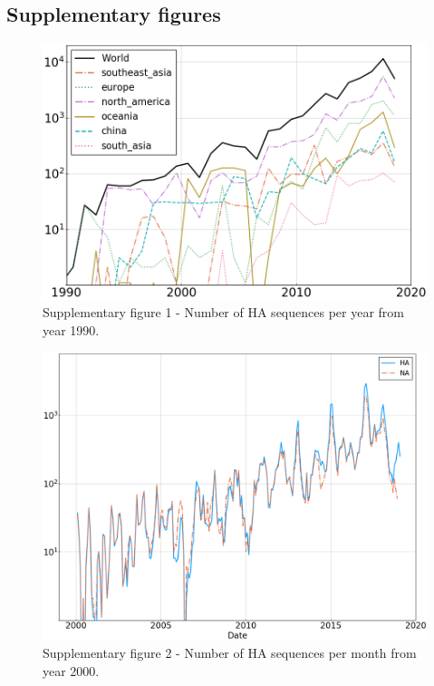 \documentclass{article}
\begin{document}
\subsection{Supplementary figures} %
\label{sub:supplementary_figures}

	\begin{figure}
		\centering
		\includegraphics[scale=0.5]{SM_figures/Nseq_per_year.png}
		\caption{Supplementary figure 1 - Number of HA sequences per year from year 1990. }
		\label{fig:nseq_per_year}
	\end{figure}
	\begin{figure}
		\centering
		\includegraphics[scale=0.5]{Figures/Nseq_per_month.png}
		\caption{Supplementary figure 2 - Number of HA sequences per month from year 2000. }
		\label{fig:nseq_per_month}
	\end{figure}
\end{document}
